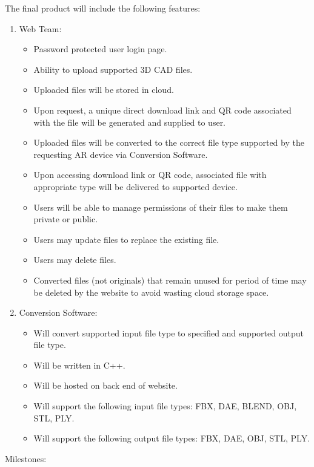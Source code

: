 The final product will include the following features:

\begin{enumerate}
	\item Web Team:
	\begin{itemize}
		\item Password protected user login page. 
		\item Ability to upload supported 3D CAD files. 
		\item Uploaded files will be stored in cloud.
		\item Upon request, a unique direct download link and QR code associated with the file will be generated and supplied to user. 
		\item Uploaded files will be converted to the correct file type supported by the requesting AR device via Conversion Software.
		\item Upon accessing download link or QR code, associated file with appropriate type will be delivered to supported device.
		\item Users will be able to manage permissions of their files to make them private or public.
		\item Users may update files to replace the existing file.
		\item Users may delete files. 
		\item Converted files (not originals) that remain unused for period of time may be deleted by the website to avoid wasting cloud storage space.  
	\end{itemize}
	\item Conversion Software:
	\begin{itemize}
		\item Will convert supported input file type to specified and supported output file type. 
		\item Will be written in C++. 
		\item Will be hosted on back end of website. 
		\item Will support the following input file types: FBX, DAE, BLEND, OBJ, STL, PLY.
		\item Will support the following output file types: FBX, DAE, OBJ, STL, PLY.
	\end{itemize} 
\end{enumerate}

Milestones:

